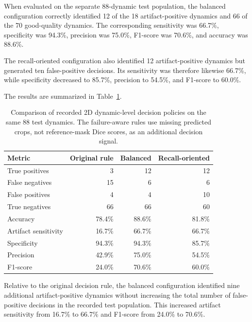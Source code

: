 When evaluated on the separate 88-dynamic test population, the balanced configuration correctly identified 12 of the 18 artifact-positive dynamics and 66 of the 70 good-quality dynamics. The corresponding sensitivity was 66.7\%, specificity was 94.3\%, precision was 75.0\%, F1-score was 70.6\%, and accuracy was 88.6\%.

The recall-oriented configuration also identified 12 artifact-positive dynamics but generated ten false-positive decisions. Its sensitivity was therefore likewise 66.7\%, while specificity decreased to 85.7\%, precision to 54.5\%, and F1-score to 60.0\%.

The results are summarized in Table~\ref{tab:results_failure_aware_policies}.

\begin{table}[htbp]
\centering
\caption{Comparison of recorded 2D dynamic-level decision policies on the same 88 test dynamics. The failure-aware rules use missing predicted crops, not reference-mask Dice scores, as an additional decision signal.}
\label{tab:results_failure_aware_policies}
\begin{tabular}{lrrr}
\hline
Metric & Original rule & Balanced & Recall-oriented \\
\hline
True positives & 3 & 12 & 12 \\
False negatives & 15 & 6 & 6 \\
False positives & 4 & 4 & 10 \\
True negatives & 66 & 66 & 60 \\
Accuracy & 78.4\% & 88.6\% & 81.8\% \\
Artifact sensitivity & 16.7\% & 66.7\% & 66.7\% \\
Specificity & 94.3\% & 94.3\% & 85.7\% \\
Precision & 42.9\% & 75.0\% & 54.5\% \\
F1-score & 24.0\% & 70.6\% & 60.0\% \\
\hline
\end{tabular}
\end{table}


Relative to the original decision rule, the balanced configuration identified nine additional artifact-positive dynamics without increasing the total number of false-positive decisions in the recorded test population. This increased artifact sensitivity from 16.7\% to 66.7\% and F1-score from 24.0\% to 70.6\%.

